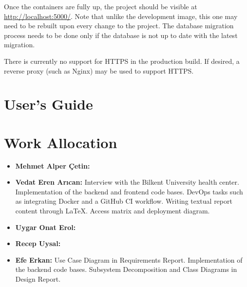 \documentclass[a4paper, 12pt, titlepage]{article}
\begin{document}
  Once the containers are fully up, the project should be visible at \url{http://localhost:5000/}.
  Note that unlike the development image, this one may need to be rebuilt upon every change to the project.
  The database migration process needs to be done only if the database is not up to date with the latest migration.
  
  There is currently no support for HTTPS in the production build.
  If desired, a reverse proxy (such as Nginx) may be used to support HTTPS.
  
  \pagebreak
  \section{User's Guide}

  
  
  \pagebreak
  \section{Work Allocation}
  
  \begin{itemize}
    \item \textbf{Mehmet Alper Çetin:}
    \item \textbf{Vedat Eren Arıcan:}
      Interview with the Bilkent University health center.
      Implementation of the backend and frontend code bases.
      DevOps tasks such as integrating Docker and a GitHub CI workflow.
      Writing textual report content through \LaTeX{}. Access matrix and deployment diagram.
    \item \textbf{Uygar Onat Erol:}
    \item \textbf{Recep Uysal:}
    \item \textbf{Efe Erkan:}
      Use Case Diagram in Requirements Report.
      Implementation of the backend code bases.
      Subsystem Decomposition and Class Diagrams in Design Report.
  \end{itemize}
\end{document}
